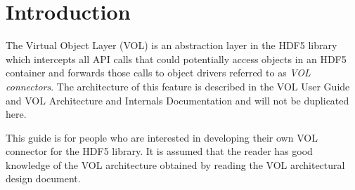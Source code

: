 

\section{Introduction}
The Virtual Object Layer (VOL) is an abstraction layer in the HDF5
library which intercepts all API calls that could potentially access
objects in an HDF5 container and forwards those calls to object drivers
referred to as \textit{VOL connectors}. The architecture of this feature
is described in the VOL User Guide and VOL Architecture and Internals
Documentation and will not be duplicated here.

This guide is for people who are interested in developing their own VOL
connector for the HDF5 library. It is assumed that the reader has good knowledge
of the VOL architecture obtained by reading the VOL architectural design
document.
